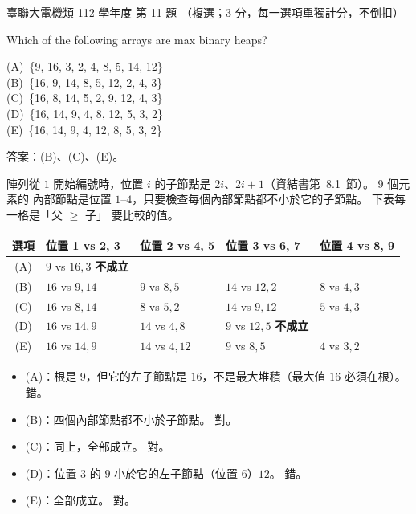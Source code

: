\begin{pastexam}[label={px:ust-112-ee-ds-11}]{臺聯大電機類 112 學年度 第 11 題}
（複選；3 分，每一選項單獨計分，不倒扣）

Which of the following arrays are max binary heaps?

(A)~\{9, 16, 3, 2, 4, 8, 5, 14, 12\}\\
(B)~\{16, 9, 14, 8, 5, 12, 2, 4, 3\}\\
(C)~\{16, 8, 14, 5, 2, 9, 12, 4, 3\}\\
(D)~\{16, 14, 9, 4, 8, 12, 5, 3, 2\}\\
(E)~\{16, 14, 9, 4, 12, 8, 5, 3, 2\}
\end{pastexam}

\begin{pastsoln}
答案：(B)、(C)、(E)。

陣列從 $1$ 開始編號時，位置 $i$ 的子節點是 $2i$、$2i + 1$（資結書第~8.1~節）。 $9$ 個元素的
內部節點是位置 $1$--$4$，只要檢查每個內部節點都不小於它的子節點。 下表每一格是「父 $\ge$ 子」
要比較的值。

\begin{center}
\begin{tabular}{cllll}
\toprule
選項 & 位置 1 vs 2, 3 & 位置 2 vs 4, 5 & 位置 3 vs 6, 7 & 位置 4 vs 8, 9 \\
\midrule
(A) & $9$ vs $16, 3$ \textbf{不成立} & & & \\
(B) & $16$ vs $9, 14$ & $9$ vs $8, 5$ & $14$ vs $12, 2$ & $8$ vs $4, 3$ \\
(C) & $16$ vs $8, 14$ & $8$ vs $5, 2$ & $14$ vs $9, 12$ & $5$ vs $4, 3$ \\
(D) & $16$ vs $14, 9$ & $14$ vs $4, 8$ & $9$ vs $12, 5$ \textbf{不成立} & \\
(E) & $16$ vs $14, 9$ & $14$ vs $4, 12$ & $9$ vs $8, 5$ & $4$ vs $3, 2$ \\
\bottomrule
\end{tabular}
\end{center}

\begin{itemize}
\item (A)：根是 $9$，但它的左子節點是 $16$，不是最大堆積（最大值 $16$ 必須在根）。 錯。
\item (B)：四個內部節點都不小於子節點。 對。
\item (C)：同上，全部成立。 對。
\item (D)：位置 $3$ 的 $9$ 小於它的左子節點（位置 $6$）$12$。 錯。
\item (E)：全部成立。 對。
\end{itemize}
\end{pastsoln}
